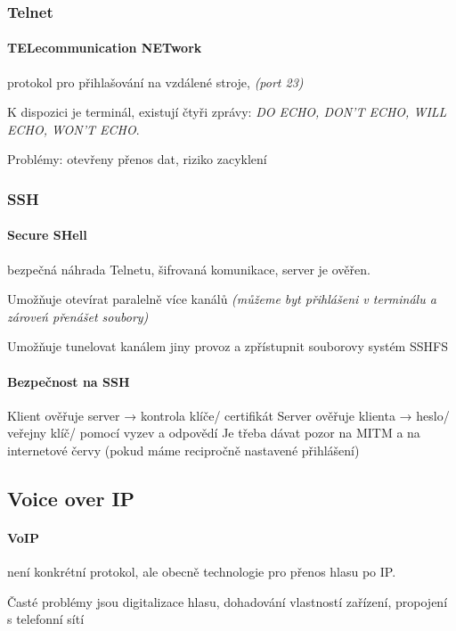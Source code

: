 \documentclass[10pt,a4paper]{article}
\begin{document}
\subsubsection{Telnet}

\paragraph{TELecommunication NETwork} protokol pro přihlašování na vzdálené stroje, \textit{(port 23)}

K dispozici je terminál, existují čtyři zprávy: \textit{DO ECHO, DON'T ECHO, WILL ECHO, WON'T ECHO}.

Problémy: otevřeny přenos dat, riziko zacyklení

\subsubsection{SSH}

\paragraph{Secure SHell} bezpečná náhrada Telnetu, šifrovaná komunikace, server je ověřen.

Umožňuje otevírat paralelně více kanálů \textit{(můžeme byt přihlášeni v terminálu a zároveń přenášet soubory)}

Umožňuje tunelovat kanálem jiny provoz a zpřístupnit souborovy systém SSHFS

\paragraph{Bezpečnost na SSH}

Klient ověřuje server → kontrola klíče/ certifikát
Server ověřuje klienta → heslo/ veřejny klíč/ pomocí vyzev a odpovědí
Je třeba dávat pozor na MITM a na internetové červy (pokud máme recipročně nastavené přihlášení)

\subsection{Voice over IP}

\paragraph{VoIP} není konkrétní protokol, ale obecně technologie pro přenos hlasu po IP.

Časté problémy jsou digitalizace hlasu, dohadování vlastností zařízení, propojení s telefonní sítí
\end{document}
